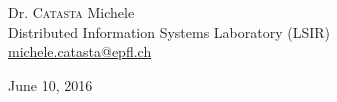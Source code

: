 \documentclass[a4paper,11pt,twoside]{article}
\newenvironment{bottompar}{\par\vspace*{\fill}}{\clearpage}
\newcommand{\mail}[1]{{\href{mailto:#1}{#1}}}
\begin{document}
\begin{titlepage}
\begin{center}
\begin{bottompar}
\begin{flushleft} \large
Dr. \textsc{Catasta} Michele\\
Distributed Information Systems Laboratory (LSIR) \\
\mail{michele.catasta@epfl.ch} \\ 
\end{flushleft}

{\large June 10, 2016}\\[1cm] %

\end{bottompar}
 

%
%
%
%
%
%






\end{center}
\end{titlepage}
\end{document}
